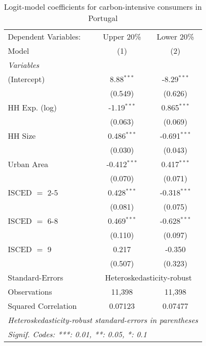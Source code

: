 
\begin{table}[htbp!]
   \centering
   \small
   \begin{adjustbox}{width = 1\textwidth, max height = 0.95\textheight, center}
      \begin{threeparttable}[b]
         \caption{\label{tab:Logit_1_PRT} Logit-model coefficients for carbon-intensive consumers in Portugal}
         \begin{tabular}{lcc}
            \tabularnewline \midrule \midrule
            Dependent Variables: & Upper 20\%     & Lower 20\%\\   
            Model                & (1)            & (2)\\  
            \midrule
            \emph{Variables}\\
            (Intercept)          & 8.88$^{***}$   & -8.29$^{***}$\\   
                                 & (0.549)        & (0.626)\\   
            HH Exp. (log)        & -1.19$^{***}$  & 0.865$^{***}$\\   
                                 & (0.063)        & (0.069)\\   
            HH Size              & 0.486$^{***}$  & -0.691$^{***}$\\   
                                 & (0.030)        & (0.043)\\   
            Urban Area           & -0.412$^{***}$ & 0.417$^{***}$\\   
                                 & (0.070)        & (0.071)\\   
            ISCED $=$ 2-5        & 0.428$^{***}$  & -0.318$^{***}$\\   
                                 & (0.081)        & (0.075)\\   
            ISCED $=$ 6-8        & 0.469$^{***}$  & -0.628$^{***}$\\   
                                 & (0.110)        & (0.097)\\   
            ISCED $=$ 9          & 0.217          & -0.350\\   
                                 & (0.507)        & (0.323)\\   
            \midrule 
            Standard-Errors & \multicolumn{2}{c}{Heteroskedasticity-robust} \\ 
            Observations         & 11,398         & 11,398\\  
            Squared Correlation  & 0.07123        & 0.07477\\  
            \midrule \midrule
            \multicolumn{3}{l}{\emph{Heteroskedasticity-robust standard-errors in parentheses}}\\
            \multicolumn{3}{l}{\emph{Signif. Codes: ***: 0.01, **: 0.05, *: 0.1}}\\
         \end{tabular}
         

\end{threeparttable}
\end{adjustbox}
\end{table}
